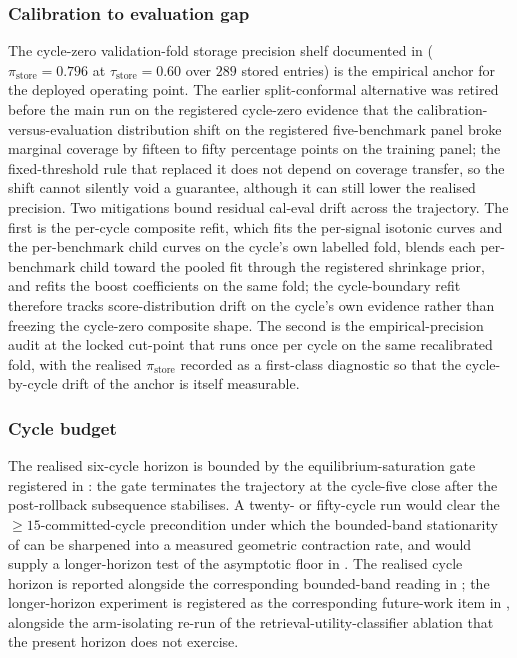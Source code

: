 \subsubsection{Calibration to evaluation gap}
\label{sec:disc-threat-gap}

The cycle-zero validation-fold storage precision shelf documented in  ($\pi_{\text{store}} = 0.796$ at $\tau_{\text{store}}=0.60$ over $289$ stored entries) is the empirical anchor for the deployed operating point. The earlier split-conformal alternative was retired before the main run on the registered cycle-zero evidence that the calibration-versus-evaluation distribution shift on the registered five-benchmark panel broke marginal coverage by fifteen to fifty percentage points on the training panel; the fixed-threshold rule that replaced it does not depend on coverage transfer, so the shift cannot silently void a guarantee, although it can still lower the realised precision. Two mitigations bound residual cal-eval drift across the trajectory. The first is the per-cycle composite refit, which fits the per-signal isotonic curves and the per-benchmark child curves on the cycle's own labelled fold, blends each per-benchmark child toward the pooled fit through the registered shrinkage prior, and refits the boost coefficients on the same fold; the cycle-boundary refit therefore tracks score-distribution drift on the cycle's own evidence rather than freezing the cycle-zero composite shape. The second is the empirical-precision audit at the locked cut-point that runs once per cycle on the same recalibrated fold, with the realised $\pi_{\text{store}}$ recorded as a first-class diagnostic so that the cycle-by-cycle drift of the anchor is itself measurable.

\subsubsection{Cycle budget}
\label{sec:disc-threat-cycles}

The realised six-cycle horizon is bounded by the equilibrium-saturation gate registered in : the gate terminates the trajectory at the cycle-five close after the post-rollback subsequence stabilises. A twenty- or fifty-cycle run would clear the $\geq 15$-committed-cycle precondition under which the bounded-band stationarity of  can be sharpened into a measured geometric contraction rate, and would supply a longer-horizon test of the asymptotic floor in . The realised cycle horizon is reported alongside the corresponding bounded-band reading in ; the longer-horizon experiment is registered as the corresponding future-work item in , alongside the arm-isolating re-run of the retrieval-utility-classifier ablation that the present horizon does not exercise.

